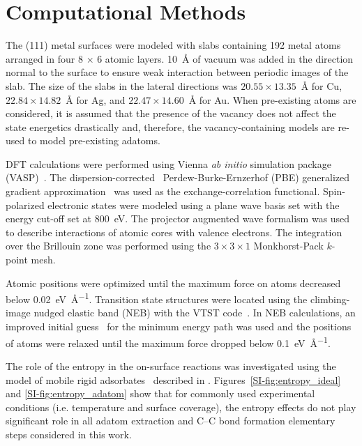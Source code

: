 \section*{Computational Methods}

The (111) metal surfaces were modeled with slabs containing 192 metal atoms arranged in four 8 $\times$ 6 atomic layers. \SI{10}{\angstrom} of vacuum was added in the direction normal to the surface to ensure weak interaction between periodic images of the slab. The size of the slabs in the lateral directions was $20.55 \times 13.35$~\si{\angstrom} for Cu, $22.84 \times 14.82$~\si{\angstrom} for Ag, and $22.47 \times 14.60$~\si{\angstrom} for Au. When pre-existing atoms are considered, it is assumed that the presence of the vacancy does not affect the state energetics drastically and, therefore, the vacancy-containing models are re-used to model pre-existing adatoms. 

DFT calculations were performed using Vienna \emph{ab initio} simulation package (VASP)~\cite{ullmann_131, ullmann_132, ullmann_133, ullmann_134}. The dispersion-corrected~\cite{ullmann_136, ullmann_137} Perdew-Burke-Ernzerhof (PBE) generalized gradient approximation~\cite{ullmann_139} was used as the exchange-correlation functional. 
Spin-polarized electronic states were modeled using a plane wave basis set with the energy cut-off set at \SI{800}{\electronvolt}.
The projector augmented wave formalism was used to describe interactions of atomic cores with valence electrons. The integration over the Brillouin zone was performed using the $3\times 3 \times1$ Monkhorst-Pack $k$-point mesh. 

Atomic positions were optimized until the maximum force on atoms decreased below \SI{0.02}{\electronvolt\per\angstrom}. 
Transition state structures were located using the climbing-image nudged elastic band (NEB) with the VTST code~\cite{ullmann_59}. 
In NEB calculations, an improved initial guess~\cite{ullmann_60, ullmann_99} for the minimum energy path was used and the positions of atoms were relaxed until the maximum force dropped below \SI{0.1}{\electronvolt\per\angstrom}.

{\zhzh

The role of the entropy in the on-surface reactions was investigated using the model of mobile rigid adsorbates~\cite{ullmann_174} described in \sinfo. Figures~\ref{SI-fig:entropy_ideal} and \ref{SI-fig:entropy_adatom} show that for commonly used experimental conditions (i.e. temperature and surface coverage), the entropy effects do not play significant role in all adatom extraction and C--C bond formation elementary steps considered in this work. 

}